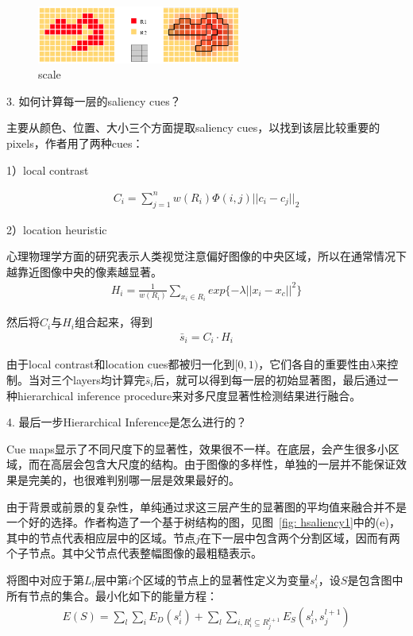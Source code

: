\documentclass[12pt]{article}
\begin{document}
\begin{figure}[!ht]
\centering
\includegraphics[width=0.6\textwidth]{hsaliency4.png}
\caption{scale}
\label{fig: hsaliency4}
\end{figure}

3. 如何计算每一层的saliency cues？

主要从颜色、位置、大小三个方面提取saliency cues，以找到该层比较重要的pixels，作者用了两种cues：

1）local contrast

\begin{align}
C_i = \sum_{j=1}^{n}w(R_i)\Phi(i, j)||c_i-c_j||_2
\end{align}


2）location heuristic

心理物理学方面的研究表示人类视觉注意偏好图像的中央区域，所以在通常情况下越靠近图像中央的像素越显著。
\begin{align}
H_i = \frac{1}{w(R_i)}\sum_{x_i \in R_i} exp\{-\lambda||x_i-x_c||^2\}
\end{align}

然后将$C_i$与$H_i$组合起来，得到
\begin{align}
\bar{s}_i = C_i \cdot H_i
\end{align}

由于local contrast和location cues都被归一化到$[0, 1)$，它们各自的重要性由$\lambda$来控制。当对三个layers均计算完$\bar{s}_i$后，就可以得到每一层的初始显著图，最后通过一种hierarchical inference procedure来对多尺度显著性检测结果进行融合。

4. 最后一步Hierarchical Inference是怎么进行的？

Cue maps显示了不同尺度下的显著性，效果很不一样。在底层，会产生很多小区域，而在高层会包含大尺度的结构。由于图像的多样性，单独的一层并不能保证效果是完美的，也很难判别哪一层是效果最好的。

由于背景或前景的复杂性，单纯通过求这三层产生的显著图的平均值来融合并不是一个好的选择。作者构造了一个基于树结构的图，见图~\ref{fig: hsaliency1}中的(e)，其中的节点代表相应层中的区域。节点$j$在下一层中包含两个分割区域，因而有两个子节点。其中父节点代表整幅图像的最粗糙表示。

将图中对应于第$L_l$层中第$i$个区域的节点上的显著性定义为变量$s_i^l$，设$S$是包含图中所有节点的集合。最小化如下的能量方程：
\begin{align}
E(S) = \sum_l \sum_i E_D(s_i^l)+\sum_l \sum_{i, R_i^l \subseteq R_j ^{l+1}} E_S(s_i^l, s_j^{l+1})
\end{align}
\end{document}
